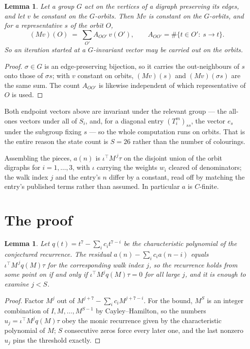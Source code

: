 \documentclass[11pt,a4paper]{article}
\theoremstyle{plain}
\newtheorem{lemma}[theorem]{Lemma}
\theoremstyle{definition}
\begin{document}
\begin{lemma}\label{lem:lump}
Let a group $G$ act on the vertices of a digraph preserving its edges, and let $v$ be constant
on the $G$-orbits. Then $Mv$ is constant on the $G$-orbits, and for a representative $s$ of
the orbit $O$,
\[
(Mv)(O)\;=\;\sum_{O'}A_{OO'}\,v(O'),\qquad
A_{OO'}=\#\{t\in O':\ s\to t\} .
\]
So an iteration started at a $G$-invariant vector may be carried out on the orbits.
\end{lemma}

\begin{proof}
$\sigma\in G$ is an edge-preserving bijection, so it carries the out-neighbours of $s$ onto
those of $\sigma s$; with $v$ constant on orbits, $(Mv)(s)$ and $(Mv)(\sigma s)$ are the same
sum. The count $A_{OO'}$ is likewise independent of which representative of $O$ is used.
\end{proof}

Both endpoint vectors above are invariant under the relevant group --- the all-ones vectors
under all of $S_i$, and, for a diagonal entry $(T_i^m)_{ss}$, the vector $e_s$ under the
subgroup fixing $s$ --- so the whole computation runs on orbits. That is the entire reason the
state count is $S=26$ rather than the number of colourings.

Assembling the pieces, $a(n)$ is $\iota^{\!\top}M^{\,j}\tau$ on the disjoint union of the
orbit digraphs for $i=1,\dots,3$, with $\iota$ carrying the weights $w_i$ cleared of
denominators; the walk index $j$ and the entry's $n$ differ by a constant, read off by
matching the entry's published terms rather than assumed. In particular $a$ is $C$-finite.

\section{The proof}

\begin{lemma}\label{lem:crit}
Let $q(t)=t^{7}-\sum_i c_it^{7-i}$ be the characteristic polynomial of the
conjectured recurrence. The residual $a(n)-\sum_ic_ia(n-i)$ equals
$\iota^{\!\top}M^{\,j}q(M)\tau$ for the corresponding walk index $j$, so the recurrence
holds from some point on if and only if $\iota^{\!\top}M^{j}q(M)\tau=0$ for all large $j$,
and it is enough to examine $j<S$.
\end{lemma}

\begin{proof}
Factor $M^{j}$ out of $M^{j+7}-\sum_ic_iM^{j+7-i}$. For the bound, $M^{S}$
is an integer combination of $I,M,\dots,M^{S-1}$ by Cayley--Hamilton, so the numbers
$u_j=\iota^{\!\top}M^{j}q(M)\tau$ obey the monic recurrence given by the characteristic
polynomial of $M$; $S$ consecutive zeros force every later one, and the last nonzero $u_j$
pins the threshold exactly.
\end{proof}
\end{document}
